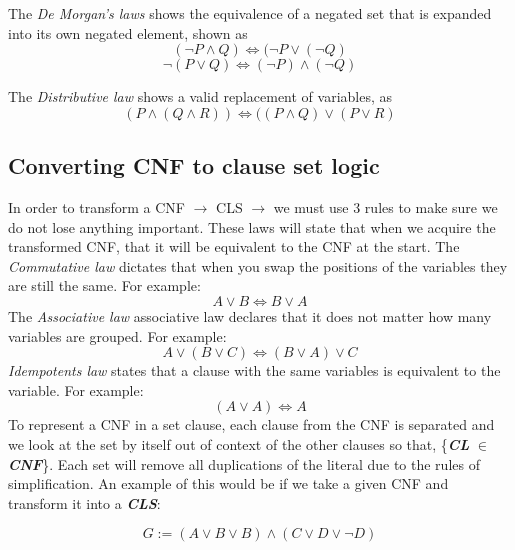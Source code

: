 \documentclass[11pt,a4paper]{report}
\begin{document}
The \emph{De Morgan's laws} shows the equivalence of a negated set that is expanded into its own negated element, shown as
\begin{displaymath}
(\neg P \land Q) \Leftrightarrow (\neg P \lor (\neg Q)
\end{displaymath}
\begin{displaymath}
\neg(P \lor Q) \Leftrightarrow (\neg P) \land (\neg Q)
\end{displaymath}


The \emph{Distributive law} shows a valid replacement of variables, as
\begin{displaymath}
(P \land (Q \land R)) \Leftrightarrow ((P \land Q) \lor (P \lor R)
\end{displaymath}


\subsection{Converting CNF to clause set logic}
In order to transform a CNF $\rightarrow$ CLS $\rightarrow$ we must use 3 rules to make sure we do not lose anything important. These laws will state that when we acquire the transformed CNF, that it will be equivalent to the CNF at the start.
The \emph{Commutative law} dictates that when you swap the positions of the variables they are still the same. For example:
\begin{displaymath}
A \lor B \Leftrightarrow B \lor A
\end{displaymath}
The \emph{Associative law} associative law declares that it does not matter how many variables are grouped. For example:
\begin{displaymath}
A \lor (B \lor C) \Leftrightarrow (B \lor A) \lor C
\end{displaymath}
\emph{Idempotents law} states that a clause with the same variables is equivalent to the variable. For example:
\begin{displaymath}
(A \lor A) \Leftrightarrow A
\end{displaymath}
To represent a CNF in a set clause, each clause from the CNF is separated and we look at the set by itself out of context of the other clauses so that, \{\textbf{\textit{CL}} $\in$ \textbf{\textit{CNF}}\}. Each set will remove all duplications of the literal due to the rules of simplification. An example of this would be if we take a given CNF and transform it into a \textbf{\textit{CLS}}:

\begin{displaymath}
G:= (A \lor B \lor B) \land (C \lor D \lor \neg D)
\end{displaymath}
\end{document}
